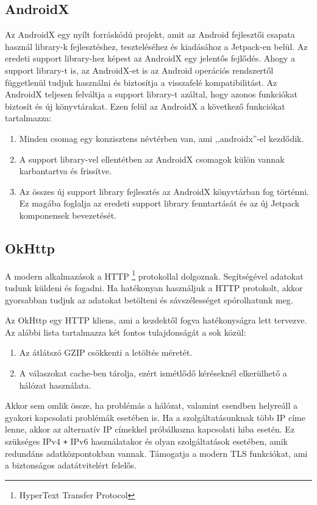 \documentclass{thesis-ekf}
\theoremstyle{definition}
\theoremstyle{remark}
\begin{document}
\subsection{AndroidX}

Az AndroidX egy nyílt forráskódú projekt, amit az Android fejlesztői csapata használ library-k fejlesztéshez, teszteléséhez és kiadásához a Jetpack-en belül.
Az eredeti support library-hez képest az AndroidX egy jelentős fejlődés. Ahogy a support library-t is, az AndroidX-et is az Android operációs rendszertől függetlenül tudjuk használni és biztosítja a visszafelé kompatibilitást.
Az AndroidX teljesen felváltja a support library-t azáltal, hogy azonos funkciókat biztosít és új könyvtárakat.\cite{androidx}
Ezen felül az AndroidX a következő funkciókat tartalmazza: 

\begin{enumerate}
	\item Minden csomag egy konzisztens névtérben van, ami ,,androidx''-el kezdődik.
	\item A support library-vel ellentétben az AndroidX csomagok külön vannak karbantartva és frissítve.
	\item Az összes új support library fejlesztés az AndroidX könyvtárban fog történni. Ez magába foglalja az eredeti support library fenntartását és az új Jetpack komponensek bevezetését.
\end{enumerate}

\subsection{OkHttp}

A modern alkalmazások a HTTP \footnote{HyperText Transfer Protocol} protokollal dolgoznak. 
Segítségével adatokat tudunk küldeni és fogadni.
Ha hatékonyan használjuk a HTTP protokolt, akkor gyorsabban tudjuk az adatokat betölteni és sávszélességet spórolhatunk meg. 

Az OkHttp egy HTTP kliens, ami a kezdektől fogva hatékonyságra lett tervezve.
Az alábbi lista tartalmazza két fontos tulajdonságát a sok közül:

\begin{enumerate}
	\item Az átlátszó GZIP csökkenti a letöltés méretét.
	\item A válaszokat cache-ben tárolja, ezért ismétlődő kéréseknél elkerülhető a hálózat használata.
\end{enumerate}

Akkor sem omlik össze, ha problémás a hálózat, valamint csendben helyreáll a gyakori kapcsolati problémák esetében is.
Ha a szolgáltatásunknak több IP címe lenne, akkor az alternatív IP címekkel próbálkozna kapcsolati hiba esetén.
Ez szükséges IPv4 \texttt{+} IPv6 használatakor és olyan szolgáltatások esetében, amik redundáns adatközpontokban vannak.
Támogatja a modern TLS funkciókat, ami a biztonságos adatátvitelért felelős.
\end{document}
